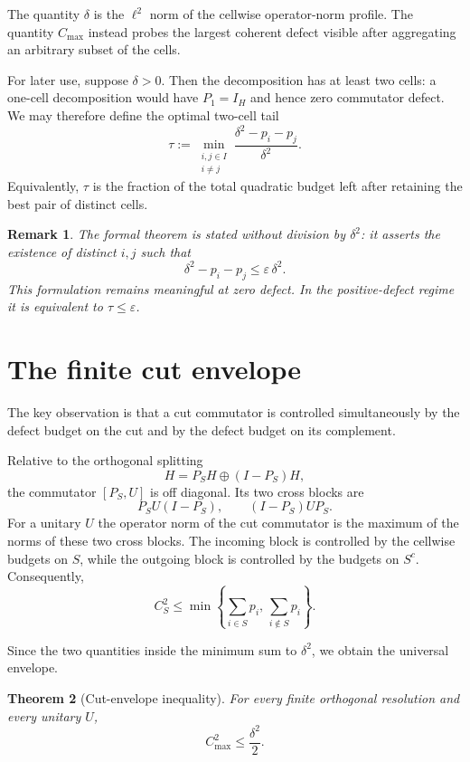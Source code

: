 \documentclass[11pt]{article}
\newtheorem{theorem}{Theorem}[section]
\newtheorem{remark}[theorem]{Remark}
\newcommand{\cmax}{C_{\max}}
\newcommand{\dd}{\delta}
\newcommand{\tauq}{\tau}
\begin{document}
The quantity $\dd$ is the $\ell^2$ norm of the cellwise operator-norm profile.
The quantity $\cmax$ instead probes the largest coherent defect visible after
aggregating an arbitrary subset of the cells.

For later use, suppose $\dd>0$.  Then the decomposition has at least two
cells: a one-cell decomposition would have $P_1=I_H$ and hence zero
commutator defect.  We may therefore define the optimal two-cell tail
\begin{equation}\label{eq:tau}
  \tauq:=
  \min_{\substack{i,j\in I\\i\neq j}}
  \frac{\dd^2-p_i-p_j}{\dd^2}.
\end{equation}
Equivalently, $\tauq$ is the fraction of the total quadratic budget left after
retaining the best pair of distinct cells.

\begin{remark}
The formal theorem is stated without division by $\dd^2$: it asserts the
existence of distinct $i,j$ such that
\[
  \dd^2-p_i-p_j\le \varepsilon\,\dd^2.
\]
This formulation remains meaningful at zero defect.  In the positive-defect
regime it is equivalent to $\tauq\le\varepsilon$.
\end{remark}

\section{The finite cut envelope}

The key observation is that a cut commutator is controlled simultaneously by
the defect budget on the cut and by the defect budget on its complement.

Relative to the orthogonal splitting
\[
  H=P_SH\oplus (I-P_S)H,
\]
the commutator $[P_S,U]$ is off diagonal.  Its two cross blocks are
\[
  P_SU(I-P_S),
  \qquad
  (I-P_S)UP_S.
\]
For a unitary $U$ the operator norm of the cut commutator is the maximum of
the norms of these two cross blocks.  The incoming block is controlled by the
cellwise budgets on $S$, while the outgoing block is controlled by the
budgets on $S^c$.  Consequently,
\begin{equation}\label{eq:cut-min}
  C_S^2
  \le
  \min\left\{
    \sum_{i\in S}p_i,\,
    \sum_{i\notin S}p_i
  \right\}.
\end{equation}

Since the two quantities inside the minimum sum to $\dd^2$, we obtain the
universal envelope.

\begin{theorem}[Cut-envelope inequality]\label{thm:envelope}
For every finite orthogonal resolution and every unitary $U$,
\[
  \boxed{\cmax^2\le\frac{\dd^2}{2}}.
\]
\end{theorem}
\end{document}
